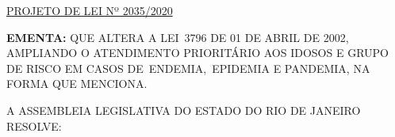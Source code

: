 \documentclass[10pt]{article}
\date{}
\begin{document}
\maketitle
\begin{center}
  \huge
  \vspace{-3cm}\href{http://alerjln1.alerj.rj.gov.br/scpro1923.nsf/f4b46b3cdbba990083256cc900746cf6/1a80f05e623824210325852f005acaec?OpenDocument}{PROJETO DE LEI Nº 2035/2020}
\bigskip
\bigskip
\bigskip
  
\end{center}

\textbf{EMENTA:} 
QUE ALTERA A LEI 3796 DE 01 DE ABRIL DE 2002, AMPLIANDO O ATENDIMENTO PRIORITÁRIO AOS IDOSOS E GRUPO DE RISCO EM CASOS DE ENDEMIA, EPIDEMIA E PANDEMIA, NA FORMA QUE MENCIONA.  








\bigskip

\noindent
A ASSEMBLEIA LEGISLATIVA DO ESTADO DO RIO DE JANEIRO RESOLVE:
\end{document}
